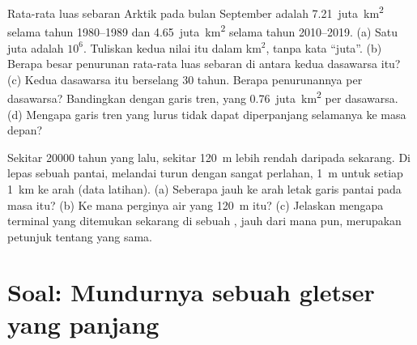 \begin{exercise}[$\star\star\star$]\label{exo:g8:ice-on-earth:11}
Rata-rata luas sebaran  Arktik pada bulan September adalah
\num{7.21}~juta~\unit{km^2} selama tahun 1980--1989 dan
\num{4.65}~juta~\unit{km^2} selama tahun 2010--2019. (a) Satu juta adalah
$10^6$. Tuliskan kedua nilai itu dalam km$^2$, tanpa kata ``juta''.
(b) Berapa besar penurunan rata-rata luas sebaran di antara kedua
dasawarsa itu? (c) Kedua dasawarsa itu berselang 30 tahun. Berapa
penurunannya per dasawarsa? Bandingkan dengan garis tren, yang
\num{0.76}~juta~\unit{km^2} per dasawarsa. (d) Mengapa garis tren yang
lurus tidak dapat diperpanjang selamanya ke masa depan?
\end{exercise}

\begin{exercise}[$\star\star\star$]\label{exo:g8:ice-on-earth:12}
Sekitar \num{20000} tahun yang lalu,  sekitar \qty{120}{m}
lebih rendah daripada sekarang. Di lepas sebuah pantai, 
melandai turun dengan sangat perlahan, \qty{1}{m} untuk setiap
\qty{1}{km} ke arah  (data latihan). (a) Seberapa jauh ke arah 
letak garis pantai pada masa itu? (b) Ke mana perginya air yang
\qty{120}{m} itu? (c) Jelaskan mengapa  terminal yang ditemukan
sekarang di sebuah , jauh dari  mana pun, merupakan
petunjuk tentang  yang sama.
\end{exercise}

\section{Soal: Mundurnya sebuah gletser yang panjang}

